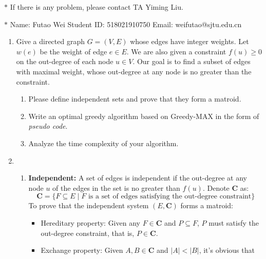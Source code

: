 \documentclass[12pt,a4paper]{article}
\makeatletter
\newtheorem*{solution}{Solution}
\theoremstyle{definition}
\renewenvironment{solution}[1][Solution] {\par\pushQED{\qed}\normalfont\topsep6\p@\@plus6\p@\relax\trivlist\item[\hskip\labelsep\bfseries#1\@addpunct{.}]\ignorespaces}{\popQED\endtrivlist\@endpefalse} \makeatother
\makeatother
\begin{document}
\noindent

\noindent{}
\begin{center}
\footnotesize{\color{red}$*$ If there is any problem, please contact TA Yiming Liu.}

\footnotesize{\color{blue}$*$ Name: Futao Wei  \quad Student ID: 518021910750 \quad Email: weifutao@sjtu.edu.cn}
\end{center}

\begin{enumerate}
\item Give a directed graph $G=(V,E)$ whose edges have integer weights. Let $w(e)$ be the weight of edge $e\in E$. We are also given a constraint $f(u)\geq 0$ on the out-degree of each node $u\in V$. Our goal is to find a subset of edges with maximal weight, whose out-degree at any node is no greater than the constraint.
	\begin{enumerate}
	    \item Please define independent sets and prove that they form a matroid.
	    \item Write an optimal greedy algorithm based on Greedy-MAX in the form of \emph{pseudo code}.
	    \item Analyze the time complexity of your algorithm.
	\end{enumerate}
	\begin{solution}
		\hfill
		\begin{enumerate}[label = (\alph*)]
			\item 
			\textbf{Independent:} A set of edges is independent if the out-degree at any node $u$ of the edges in the set is no greater than $f(u)$. Denote $\mathbf{C}$ as:  \[\mathbf{C} = \{F \subseteq E \mid F \text{ is a set of edges satisfying the out-degree constraint} \}\]
			To prove that the independent system $(E, \mathbf{C})$ forms a matroid: 
			\begin{itemize}
				\item 
				Hereditary property: Given any $F \in \mathbf{C}$ and $P \subseteq F$, $P$ must satisfy the out-degree constraint, that is, $P \in \mathbf{C}$.
				\item
				Exchange property: Given $A, B \in \mathbf{C}$ and $| A | < | B |$, it's obvious that 

\end{itemize}
\end{enumerate}
\end{solution}
\end{enumerate}
\end{document}
